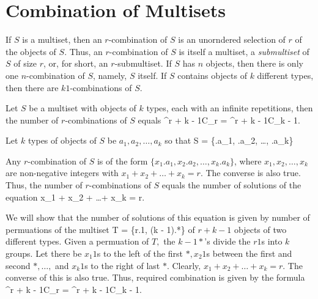 \section{Combination of Multisets}
If $S$ is a multiset, then an $r$-combination of $S$ is an unorndered selection of $r$ of the objects of $S$. Thus, an
$r$-combination of $S$ is itself a multiset, a {\it submultiset} of $S$ of size $r$, or, for short, an $r$-submultiset. If $S$
has $n$ objects, then there is only one $n$-combination of $S$, namely, $S$ itself. If $S$ contains objects of $k$ different types,
then there are $k 1$-combinations of $S$.

Let $S$ be a multiset with objects of $k$ types, each with an infinite repetitions, then the number of $r$-combinations of $S$
equals
\startformula {}^{r + k - 1}C_r = {}^{r + k - 1}C_{k - 1}.\stopformula

Let $k$ types of objects of $S$ be $a_1, a_2, \ldots, a_k$ so that
\startformula S = \{\infty.a_1, \infty.a_2, \ldots, \infty.a_k\}\stopformula

Any $r$-combination of $S$ is of the form $\{x_1.a_1, x_2.a_2, \ldots, x_k.a_k\}$, where $x_1, x_2, \ldots, x_k$ are non-negative
integers with $x_1 + x_2 + \ldots + x_k = r$. The converse is also true. Thus, the number of $r$-combinations of $S$ equals the
number of solutions of the equation \startformula x_1 + x_2 + \ldots + x_k = r.\stopformula

We will show that the number of solutions of this equation is given by number of permuations of the multiset
\startformula T = \{r.1, (k - 1).*\}\stopformula
of $r + k - 1$ objects of two different types. Given a permuation of $T,$ the $k - 1 *$'s divide the $r 1$s into $k$ groups. Let
there be $x_1 1$s to the left of the first $*, x_2 1$s between the first and second $*,\ldots,$ and $x_k 1$s to the right of last
$*$. Clearly, $x_1 + x_2 + \ldots + x_k = r$. The converse of this is also true. Thus, required combination is given by the
formula \startformula {}^{r + k - 1}C_r = {}^{r + k - 1}C_{k - 1}.\stopformula

